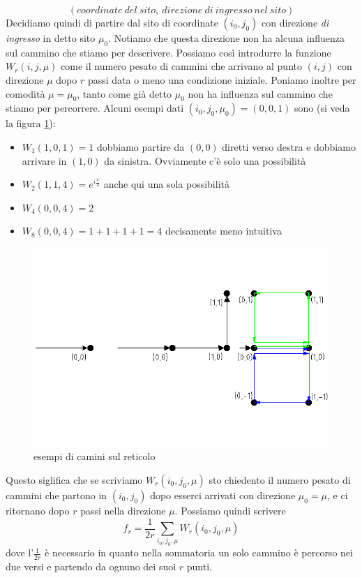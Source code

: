 \documentclass[11pt]{article}
\begin{document}
$$ (coordinate \ del \ sito, \ direzione \ di \ ingresso \ nel \ sito)
$$
Decidiamo quindi di partire dal sito di coordinate $(i_0,j_0)$ con direzione \emph{di ingresso} in detto sito $\mu_0$. Notiamo che questa direzione non ha alcuna influenza sul cammino che stiamo per descrivere. Possiamo così introdurre la funzione $W_r(i,j,\mu)$ come il numero pesato di cammini che arrivano al punto $(i,j)$ con direzione $\mu$ dopo $r$ passi data o meno una condizione iniziale. Poniamo inoltre per comodità $\mu=\mu_0$, tanto come già detto $\mu_0$ non ha influenza sul cammino che stiamo per percorrere. Alcuni esempi dati $(i_0,j_0,\mu_0)=(0,0,1)$ sono (si veda la figura \ref{v6}):
\begin{itemize}
\item{$W_1(1,0,1)=1$ dobbiamo partire da $(0,0)$ diretti verso destra e dobbiamo arrivare in $(1,0)$ da sinistra. Ovviamente c'è solo una possibilità}
\item{$W_2(1,1,4)=e^{i\frac{\pi}{4}}$ anche qui una sola possibilità}
\item{$W_4(0,0,4)=2$}
\item{$W_8(0,0,4)=1+1+1+1=4$ decisamente meno intuitiva}
\end{itemize}
\begin{figure}[h]
\centering
\includegraphics[width=0.8\columnwidth]{v6}
\caption{esempi di camini sul reticolo}
\label{v6}
\end{figure}
 Questo siglifica che se scriviamo $W_r(i_0,j_0,\mu)$ sto chiedento il numero pesato di cammini che partono in $(i_0,j_0)$ dopo esserci arrivati con direzione $\mu_0=\mu$, e ci ritornano dopo $r$ passi nella direzione $\mu$. Possiamo quindi scrivere
 $$ f_r=\frac{1}{2r}\sum_{i_0,j_0,\mu}W_r(i_0,j_0,\mu)
 $$
dove l'$\frac{1}{2r}$ è necessario in quanto nella sommatoria un solo cammino è percorso nei due versi e partendo da ognuno dei suoi $r$ punti. 
\end{document}

